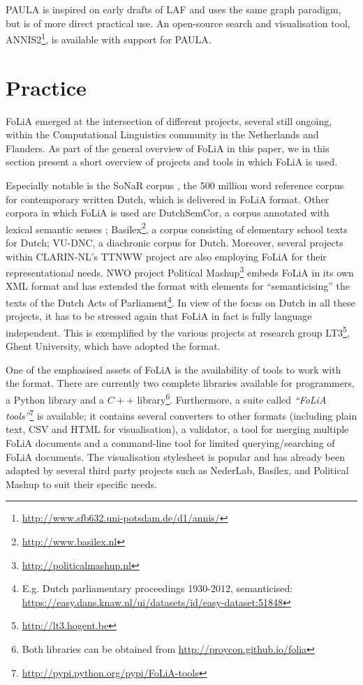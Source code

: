 \documentclass[a4paper,10pt,twoside]{article}
\begin{document}
PAULA is inspired on early drafts of LAF and uses the same graph paradigm, but
is of more direct practical use. An open-source search and visualisation tool,
ANNIS2\footnote{\url{http://www.sfb632.uni-potsdam.de/d1/annis/}}, is available
with support for PAULA.


\section{Practice}
\label{sec:practice}

FoLiA emerged at the intersection of different projects, several still ongoing, within the Computational
Linguistics community in the Netherlands and Flanders. As part of the general overview of FoLiA in this paper, we in
this section present a short overview of projects and tools in which FoLiA is
used.
 
Especially notable is the SoNaR corpus \cite{StevinSONAR2013}, the 500 million
word reference corpus for contemporary written Dutch, which is delivered in
FoLiA format. Other corpora in which FoLiA is used are DutchSemCor, a corpus
annotated with lexical semantic senses \cite{DUTCHSEMCOR};
Basilex\footnote{\url{http://www.basilex.nl}}, a corpus consisting of
elementary school texts for Dutch; VU-DNC, a diachronic corpus for Dutch.
Moreover, several projects within CLARIN-NL's TTNWW project are also employing FoLiA for
their representational needs. NWO project Political Mashup\footnote{\url{http://politicalmashup.nl}} embeds FoLiA in its own XML
format and has extended the format with elements for ``semanticising'' the
texts of the Dutch Acts of Parliament\footnote{E.g. Dutch parliamentary
proceedings 1930-2012, semanticised:
\url{https://easy.dans.knaw.nl/ui/datasets/id/easy-dataset:51848}}. In view of
the focus on Dutch in all these projects, it has to be stressed again that
FoLiA in fact is fully language independent. This is exemplified by the various
projects at research group LT3\footnote{\url{http://lt3.hogent.be}}, Ghent
University, which have adopted the format.

One of the emphasised assets of FoLiA is the availability of tools to work with the
format. There are currently two complete libraries available for programmers, a Python
library and a $C++$ library\footnote{Both libraries can be obtained from
\url{http://proycon.github.io/folia}}. Furthermore, a suite called \emph{``FoLiA
tools''}\footnote{\url{http://pypi.python.org/pypi/FoLiA-tools}} is
available; it contains several converters to other formats (including plain
text, CSV and HTML for visualisation), a validator, a tool for merging
multiple FoLiA documents and a command-line tool for limited querying/searching
of FoLiA documents. The visualisation stylesheet is popular and has already
been adapted by several third party projects such as NederLab, Basilex, and Political
Mashup to suit their specific needs.
\end{document}
